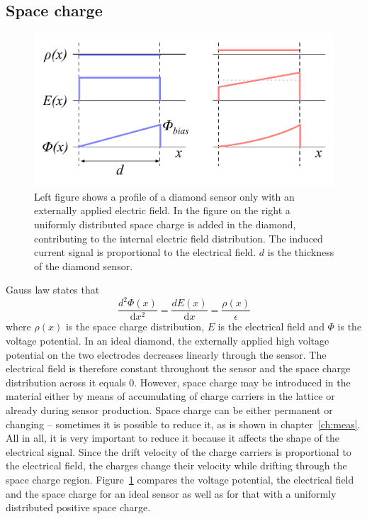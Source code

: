  

\subsection{Space charge}
\label{sec:spacecharge}
\begin{figure}[!t]
\begin{center}
\includegraphics[width=0.6\linewidth]{02_pulse_formation/pics/plots/spcchg}
\caption{Left figure shows a profile of a diamond sensor only with an externally applied electric field. In the figure on the right a uniformly distributed space charge is added in the diamond, contributing to  the internal electric field distribution. The induced current signal is proportional to the electrical field. $d$ is the thickness of the diamond sensor.}
\label{fig:spcchg}
\end{center}
\end{figure}
Gauss law states that 
\begin{equation}
\label{eq:poisson}
\frac{d^2\Phi(x)}{\mathrm{d}x^2} = \frac{dE(x)}{\mathrm{d}x} = \frac{\rho(x)}{\epsilon}
\end{equation}
where $\rho(x)$ is the space charge distribution, $E$ is the electrical field and $\Phi$ is the voltage potential. In an ideal diamond, the externally applied high voltage potential on the two electrodes decreases linearly through the sensor. The electrical field is therefore constant throughout the sensor and the space charge distribution across it equals 0. However, space charge may be introduced in the material either by means of accumulating of charge carriers in the lattice or already during sensor production. Space charge can be either permanent or changing -- sometimes it is possible to reduce it, as is shown in chapter~\ref{ch:meas}. All in all, it is very important to reduce it because it affects the shape of the electrical signal. Since the drift velocity of the charge carriers is proportional to the electrical field, the charges change their velocity while drifting through the space charge region. Figure~\ref{fig:spcchg} compares the voltage potential, the electrical field and the space charge for an ideal sensor as well as for that with a uniformly distributed positive space charge.




